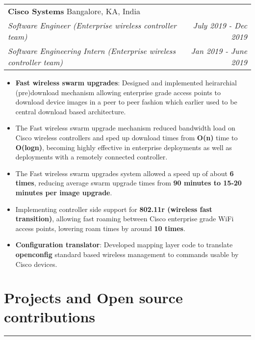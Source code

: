 \documentclass[a4paper,6pt]{article}
\begin{document}
\vspace{4px}
\hspace{5px}
\begin{tabularx}{\textwidth}{X r}
	\large{\textbf{Cisco Systems}} \small Bangalore, KA, India& \\
	\textit{\small Software Engineer (Enterprise wireless controller team)} & \textit{July 2019 - Dec 2019} \\
	\textit{\small Software Engineering Intern  (Enterprise wireless controller team)}& \textit{Jan 2019 - June 2019} \\
\end{tabularx}

\small
\begin{itemize}
	\itemsep0em
	\item \textcolor{mygray}{\textbf{Fast wireless swarm upgrades}}: Designed and implemented heirarchial (pre)download mechanism allowing enterprise grade access points to download device images in a peer to peer fashion which earlier used to be central download based architecture. 
        \item The Fast wireless swarm upgrade mechanism reduced bandwidth load on Cisco wireless controllers and sped up download times from \textcolor{mygray}{\textbf{O(n)}} time to \textcolor{mygray}{\textbf{O(logn)}}, becoming highly effective in enterprise deployments as well as deployments with a remotely connected controller.
        \item The Fast wireless swarm upgrades system allowed a speed up of about \textcolor{mygray}{\textbf{6 times}}, reducing average swarm upgrade times from \textcolor{mygray}{\textbf{90 minutes to 15-20 minutes per image upgrade}}.
	\item  Implementing controller side support for \textcolor{mygray}{\textbf{802.11r (wireless fast transition)}}, allowing fast roaming between Cisco enterprise grade WiFi access points, lowering roam times by around \textcolor{mygray}{\textbf{10 times}}.
    \item \textcolor{mygray}{\textbf{Configuration translator}}: Developed mapping layer code to translate \textcolor{mygray}{\textbf{openconfig}} standard based wireless management to commands usable by Cisco devices. 
\end{itemize}

\section*{Projects and Open source contributions}
\vspace{-8px}
\hrule
\vspace{4px}
\end{document}
